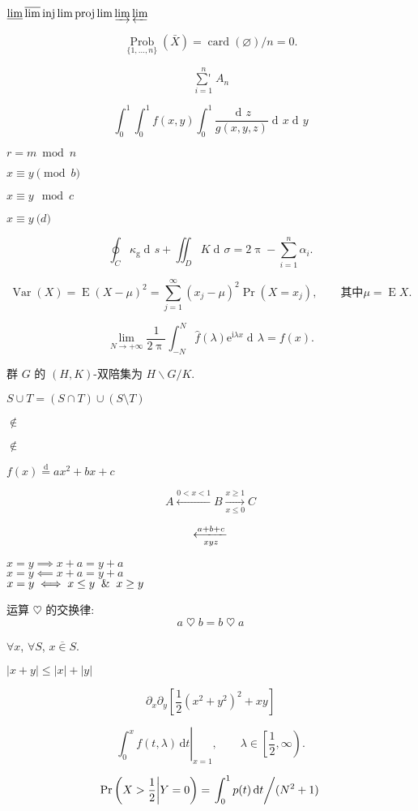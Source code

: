 \documentclass{ctexart}
\DeclareMathOperator\dif{d\!}
\newcommand\defeq{\stackrel{\text{d}}{=}}
\newcommand\varnotin{\mathrel{\overline{\in}}}
\newcommand*\abs[1]{\lvert#1\rvert}
\begin{document}
$\varliminf\varlimsup\injlim\projlim\varinjlim\varprojlim$

\[  \operatorname*{Prob}_{\{1,\ldots,n\}}
      (\bar X) =
    \operatorname{card}(\varnothing)/n = 0. \]

\[ \mathop{\mathord{\sum}'}\limits_{i=1}^n A_n \]

\[ \int_0^1 \int_0^1 f(x,y) \int_0^1 \frac{\dif z}{g(x,y,z)} \dif x\dif y \]

$r = m \bmod n$

$x\equiv y \pmod b$

$x\equiv y \mod c$

$x\equiv y \pod d$

\[ \oint_{C} \kappa_{\mathrm g} \dif s + {\iint_{D} K \dif \sigma} = 2\uppi - \sum_{i=1}^n \alpha_i. \]

\[ \operatorname{Var}(X) = \operatorname{E}(X-\mu)^2 = \sum_{j=1}^\infty (x_j - \mu)^2 \operatorname{Pr}(X = x_j), \qquad \text{其中} \mu = \operatorname{E}\!X. \]

\[
\lim_{N\to +\infty} \frac{1}{2\uppi} \int_{-N}^{N}\hat{f}(\lambda)\mathrm{e}^{\mathrm{i}\lambda x}\dif \lambda = f(x).
\]

群 $G$ 的 $(H,K)$-双陪集为 $H\backslash G/K$.

$S\cup T = (S\cap T)\cup (S\setminus T)$

$\not\in$

$\notin$

$f(x) \defeq ax^2+bx+c$

\[
A \xleftarrow{0<x<1} B
\xrightarrow[x\leq 0]{x\geq 1} C
\]

\[ \xlongleftarrow[xyz]{a+b+c} \]

$x =y \implies x+a=y+a$\\
$x=y \impliedby x+a=y+a$\\
$x=y \iff x\le y \And x\ge y$

运算 $\heartsuit$ 的交换律:
\[ a \mathbin{\heartsuit} b = b \mathbin{\heartsuit} a \]

$\forall x$, $\forall S$, $x\varnotin S$.

$\abs{x+y} \le \abs{x} + \abs{y}$

\[
\partial_x \partial_y \left[
\frac12 \left(x^2+y^2\right)^2 + xy
\right]
\]

\[
\left.
\int_0^x f(t,\lambda) \,\mathrm{d}t
\right|_{x=1}, \qquad
\lambda \in
\left[\frac12,\infty\right).
\]

\[
\Pr \left( X>\frac12
\middle\vert Y=0 \right)
= \left.
\int_0^1 p(t)\,\mathrm{d}t
\middle/ ( N^2+1 ) \right.
\]
\end{document}
